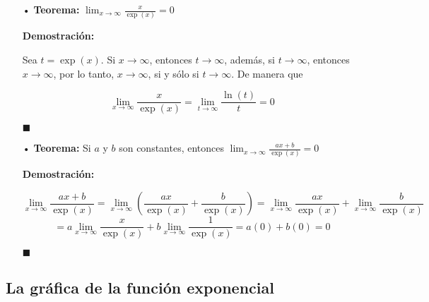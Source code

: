 \documentclass[pts12]{article}
\numberwithin{equation}{section}
\newcommand{\Col}{\color{ProcessBlue}}
\begin{document}
\begin{itemize}
\item[\Col •] \textbf{Teorema:} $\lim_{x\to\infty}\frac{x}{\exp(x)}=0$

\textbf{Demostración:} 

Sea $t=\exp(x)$. Si $x\to\infty$, entonces $t\to\infty$, además, si $t\to\infty$, entonces $x\to\infty$, por lo tanto, $x\to\infty$, si y sólo si $t\to\infty$. De manera que

$$ \lim_{x\to\infty}\frac{x}{\exp(x)}=\lim_{t\to\infty}\frac{\ln(t)}{t}=0 $$

\begin{flushright}
$\blacksquare$
\end{flushright} 

\item[\Col •] \textbf{Teorema:} Si $a$ y $b$ son constantes, entonces $\lim_{x\to\infty}\frac{ax+b}{\exp(x)}=0$

\textbf{Demostración:} 

$$ \lim_{x\to\infty}\frac{ax+b}{\exp(x)}=\lim_{x\to\infty}\left( \frac{ax}{\exp(x)}+\frac{b}{\exp(x)} \right)=\lim_{x\to\infty}\frac{ax}{\exp(x)}+\lim_{x\to\infty}\frac{b}{\exp(x)} $$
$$ =a\lim_{x\to\infty}\frac{x}{\exp(x)}+b\lim_{x\to\infty}\frac{1}{\exp(x)}=a(0)+b(0)=0 $$


\begin{flushright}
$\blacksquare$
\end{flushright} 

\end{itemize}


\subsection{\Col La gráfica de la función exponencial}
\end{document}
